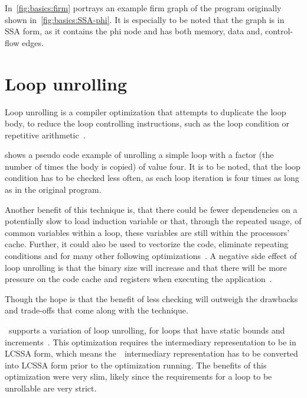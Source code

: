 In~\cref{fig:basics:firm} portrays an example firm graph of the program originally shown in~\cref{fig:basics:SSA-phi}.
It is especially to be noted that the graph is in SSA form, as it contains the phi node and has both memory, data and, control-flow edges.



\section{Loop unrolling}\label{sec:basics:unrolling}

Loop unrolling is a compiler optimization that attempts to duplicate the loop body, to reduce the loop controlling instructions, such as the loop condition or repetitive arithmetic~\cite{aho_ullman_1979}.

 shows a pseudo code example of unrolling a simple loop with a factor (the number of times the body is copied) of value four.
It is to be noted, that the loop condition has to be checked less often, as each loop iteration is four times as long as in the original program.

Another benefit of this technique is, that there could be fewer dependencies on a potentially slow to load induction variable or that, through the repeated usage, of common variables within a loop, these variables are still within the processors' cache.
Further, it could also be used to vectorize the code, eliminate repeating conditions and for many other following optimizations~\cite{fog_2018}.
A negative side effect of loop unrolling is that the binary size will increase and that there will be more pressure on the code cache and registers when executing the application~\cite{Sarkar2001}.

Though the hope is that the benefit of less checking will outweigh the drawbacks and trade-offs that come along with the technique.

\libFIRM~supports a variation of loop unrolling, for loops that have static bounds and increments~\cite{aebi18bachelorarbeit}.
This optimization requires the intermediary representation to be in LCSSA form, which means the~\libFIRM~intermediary representation has to be converted into LCSSA form prior to the optimization running\cite{aebi18bachelorarbeit}.
The benefits of this optimization were very slim, likely since the requirements for a loop to be unrollable are very strict.




